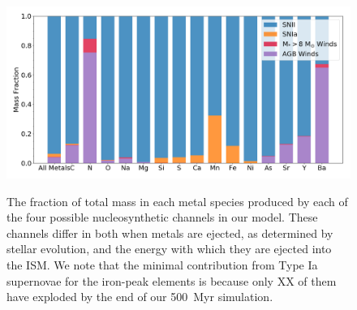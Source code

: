 \documentclass[twocolumn]{aastex61}
\begin{document}
\begin{figure}
\centering
\includegraphics[width=0.95\linewidth]{species_bar_sources.png}\\
\caption{The fraction of total mass in each metal species produced by each of the four possible nucleosynthetic channels in our model. These channels differ in both when metals are ejected, as determined by stellar evolution, and the energy with which they are ejected into the ISM. We note that the minimal contribution from Type Ia supernovae for the iron-peak elements is because only XX of them have exploded by the end of our 500~Myr simulation.}
%
\label{fig:species_sources}
\end{figure}
\end{document}
